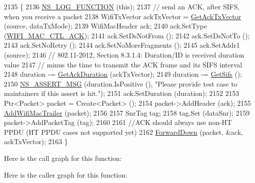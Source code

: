 \begin{DoxyCode}
2135 \{
2136   \hyperlink{log-macros-disabled_8h_a90b90d5bad1f39cb1b64923ea94c0761}{NS\_LOG\_FUNCTION} (\textcolor{keyword}{this});
2137   \textcolor{comment}{// send an ACK, after SIFS, when you receive a packet}
2138   WifiTxVector ackTxVector = \hyperlink{classns3_1_1MacLow_aacb6b94de35df106b76d93b05d145d13}{GetAckTxVector} (source, dataTxMode);
2139   WifiMacHeader ack;
2140   ack.SetType (\hyperlink{namespacens3_a9318472db39b35b2092de5c721e6ab0aa94b81d2741a3a2ab30de5df6e04fc850}{WIFI\_MAC\_CTL\_ACK});
2141   ack.SetDsNotFrom ();
2142   ack.SetDsNotTo ();
2143   ack.SetNoRetry ();
2144   ack.SetNoMoreFragments ();
2145   ack.SetAddr1 (source);
2146   \textcolor{comment}{// 802.11-2012, Section 8.3.1.4:  Duration/ID is received duration value}
2147   \textcolor{comment}{// minus the time to transmit the ACK frame and its SIFS interval}
2148   duration -= \hyperlink{classns3_1_1MacLow_afb6684c2fedc5d0595a80b0f6e959065}{GetAckDuration} (ackTxVector);
2149   duration -= \hyperlink{classns3_1_1MacLow_a9107421b7ed9f291d60b8344b4918e56}{GetSifs} ();
2150   \hyperlink{assert_8h_aff5ece9066c74e681e74999856f08539}{NS\_ASSERT\_MSG} (duration.IsPositive (), \textcolor{stringliteral}{"Please provide test case to maintainers if this
       assert is hit."});
2151   ack.SetDuration (duration);
2152 
2153   Ptr<Packet> packet = Create<Packet> ();
2154   packet->AddHeader (ack);
2155   \hyperlink{classns3_1_1MacLow_acaafc67755f16f347e9161310d71e3ef}{AddWifiMacTrailer} (packet);
2156 
2157   SnrTag tag;
2158   tag.Set (dataSnr);
2159   packet->AddPacketTag (tag);
2160 
2161   \textcolor{comment}{//ACK should always use non-HT PPDU (HT PPDU cases not supported yet)}
2162   \hyperlink{classns3_1_1MacLow_a4eefbfa3d57539dadf0224cc7fcf952d}{ForwardDown} (packet, &ack, ackTxVector);
2163 \}
\end{DoxyCode}


Here is the call graph for this function\+:




Here is the caller graph for this function\+:


